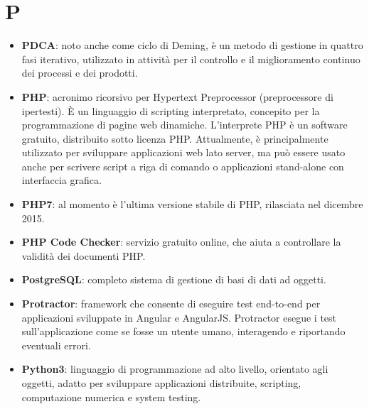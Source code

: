 \newpage
\section{P}

\begin{itemize}
	\item \textbf{PDCA}: noto anche come ciclo di Deming, è un metodo di gestione in quattro fasi iterativo, utilizzato in attività per il controllo e il miglioramento continuo dei processi e dei prodotti.
	\item \textbf{PHP}: acronimo ricorsivo per Hypertext Preprocessor (preprocessore di ipertesti). \MakeUppercase{è} un linguaggio di scripting interpretato, concepito per la programmazione di pagine web dinamiche. L'interprete PHP è un software gratuito, distribuito sotto licenza PHP. Attualmente, è principalmente utilizzato per sviluppare applicazioni web lato server, ma può essere usato anche per scrivere script a riga di comando o applicazioni stand-alone con interfaccia grafica.
	\item \textbf{PHP7}: al momento è l'ultima versione stabile di PHP, rilasciata nel dicembre 2015.
	\item \textbf{PHP Code Checker}: servizio gratuito online, che aiuta a controllare la validità dei documenti PHP.
	\item \textbf{PostgreSQL}: completo sistema di gestione di basi di dati ad oggetti.
	\item \textbf{Protractor}: framework che consente di eseguire test end-to-end per applicazioni sviluppate in Angular e AngularJS. Protractor esegue i test sull'applicazione come se fosse un utente umano, interagendo e riportando eventuali errori.
	\item \textbf{Python3}: linguaggio di programmazione ad alto livello, orientato agli oggetti, adatto per sviluppare applicazioni distribuite, scripting, computazione numerica e system testing.
\end{itemize}


